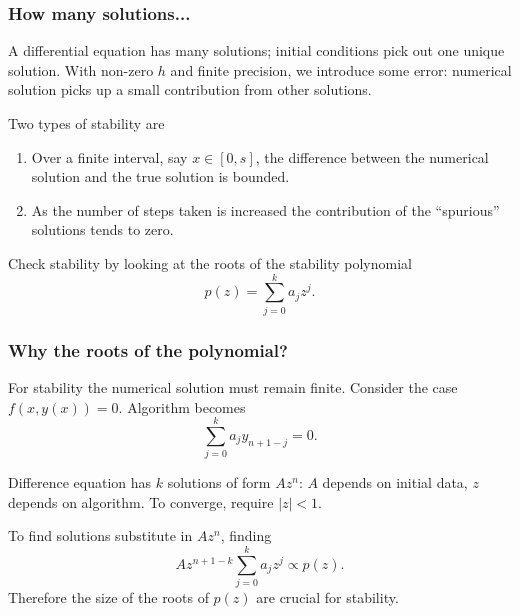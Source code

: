 \documentclass{beamer}
\begin{document}
\begin{frame}
  \frametitle{How many solutions...}

  A differential equation has many solutions; initial conditions pick
  out one unique solution.  \pause With non-zero $h$ and finite
  precision, we introduce some error: numerical solution picks up a
  small contribution from other solutions. \pause

  \vspace{1ex}

  Two types of stability are
  \begin{enumerate}
  \item Over a finite interval, say $x \in [0, s]$, the difference
    between the numerical solution and the true solution is
    bounded. \pause
  \item As the number of steps taken is increased the contribution of
    the ``spurious'' solutions tends to zero.
  \end{enumerate} \pause

  Check stability by looking at the roots of the stability polynomial
  \begin{equation*}
    p(z) = \sum_{j=0}^k a_j z^j.
  \end{equation*}

\end{frame}

\begin{frame}
  \frametitle{Why the roots of the polynomial?}

  For stability the numerical solution must remain finite. \pause
  Consider the case $f(x, y(x)) = 0$.  Algorithm becomes
  \begin{equation*}
    \sum_{j=0}^k a_j y_{n+1-j} = 0.
  \end{equation*} \pause

  \vspace{1ex}

  Difference equation has $k$ solutions of form $A z^n$: $A$
  depends on initial data, $z$ depends on algorithm. \pause To
  converge, require $|z| < 1$. \pause

  \vspace{1ex}

  To find solutions substitute in $A z^n$, finding
  \begin{equation*}
    A z^{n+1-k} \sum_{j=0}^k a_j z^j \propto p(z).
  \end{equation*} \pause
  Therefore the size of the roots of $p(z)$ are crucial for stability.

\end{frame}
\end{document}
